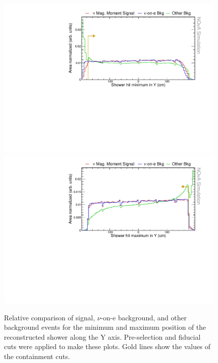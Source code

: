 \begin{figure}[hbtp]
\centering
\includegraphics[width=.9\textwidth]{Plots/NuMMEventSelection/N1Cut_minY.pdf}
\includegraphics[width=.9\textwidth]{Plots/NuMMEventSelection/N1Cut_maxY.pdf}
\caption{Relative comparison of signal, $\nu$-on-e background, and other background events for the minimum and maximum position of the reconstructed shower along the Y axis. Pre-selection and fiducial cuts were applied to make these plots. Gold lines show the values of the containment cuts.}
\label{fig:ContainmentCutsY}
\end{figure}

